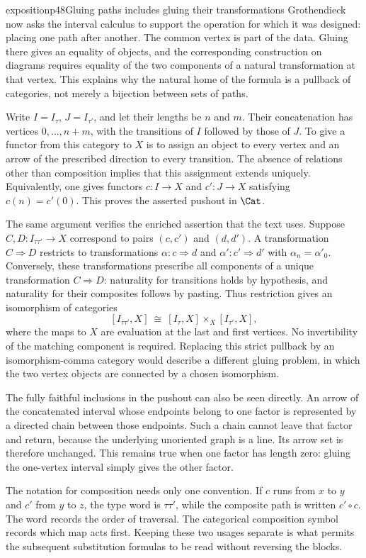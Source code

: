 \begin{dcomment}{exposition}{p48}{Gluing paths includes gluing their transformations}
Grothendieck now asks the interval calculus to support the operation for which it was designed: placing one path after another. The common vertex is part of the data. Gluing there gives an equality of objects, and the corresponding construction on diagrams requires equality of the two components of a natural transformation at that vertex. This explains why the natural home of the formula is a pullback of categories, not merely a bijection between sets of paths.

Write $I=I_\tau$, $J=I_{\tau'}$, and let their lengths be $n$ and $m$. Their concatenation has vertices $0,\ldots,n+m$, with the transitions of $I$ followed by those of $J$. To give a functor from this category to $X$ is to assign an object to every vertex and an arrow of the prescribed direction to every transition. The absence of relations other than composition implies that this assignment extends uniquely. Equivalently, one gives functors $c:I\to X$ and $c':J\to X$ satisfying $c(n)=c'(0)$. This proves the asserted pushout in $\Cat$.

The same argument verifies the enriched assertion that the text uses. Suppose $C,D:I_{\tau\tau'}\to X$ correspond to pairs $(c,c')$ and $(d,d')$. A transformation $C\Rightarrow D$ restricts to transformations $\alpha:c\Rightarrow d$ and $\alpha':c'\Rightarrow d'$ with $\alpha_n=\alpha'_0$. Conversely, these transformations prescribe all components of a unique transformation $C\Rightarrow D$: naturality for transitions holds by hypothesis, and naturality for their composites follows by pasting. Thus restriction gives an isomorphism of categories
\[
 [I_{\tau\tau'},X]\ \cong\ [I_\tau,X]\times_X[I_{\tau'},X],
\]
where the maps to $X$ are evaluation at the last and first vertices. No invertibility of the matching component is required. Replacing this strict pullback by an isomorphism-comma category would describe a different gluing problem, in which the two vertex objects are connected by a chosen isomorphism.

The fully faithful inclusions in the pushout can also be seen directly. An arrow of the concatenated interval whose endpoints belong to one factor is represented by a directed chain between those endpoints. Such a chain cannot leave that factor and return, because the underlying unoriented graph is a line. Its arrow set is therefore unchanged. This remains true when one factor has length zero: gluing the one-vertex interval simply gives the other factor.

The notation for composition needs only one convention. If $c$ runs from $x$ to $y$ and $c'$ from $y$ to $z$, the type word is $\tau\tau'$, while the composite path is written $c'\circ c$. The word records the order of traversal. The categorical composition symbol records which map acts first. Keeping these two usages separate is what permits the subsequent substitution formulas to be read without reversing the blocks.
\end{dcomment}

